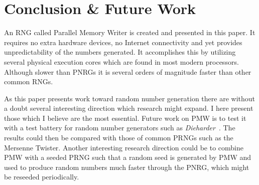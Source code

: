 \section{Conclusion \& Future Work}
\label{sec:conclusion}
An RNG called Parallel Memory Writer is created and presented in this paper.
It requires no extra hardware devices, no Internet connectivity and yet provides unpredictability of the numbers generated.
It accomplishes this by utilizing several physical execution cores which are found in most modern processors.
Although slower than PNRGs it is several orders of magnitude faster than other common RNGs.

As this paper presents work toward random number generation there are without a doubt several interesting direction which research might expand. I here present those which I believe are the most essential.
Future work on PMW is to test it with a test battery for random number generators such as \emph{Dieharder}~\citep{dieharder}.
The results could then be compared with those of common PRNGs such as the Mersenne Twister.
Another interesting research direction could be to combine PMW with a seeded PRNG such that a random seed is generated by PMW and used to produce random numbers much faster through the PNRG, which might be reseeded periodically.